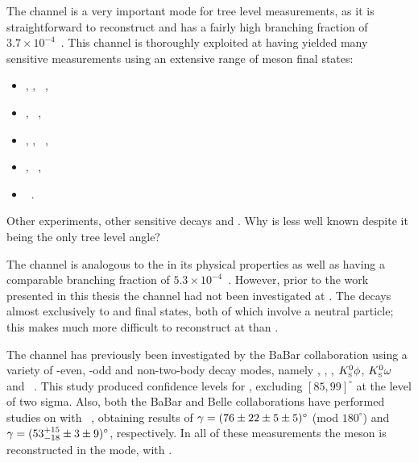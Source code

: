 The \decay{\Bm}{\D\Km} channel is a very important mode for tree level \Pgamma measurements, as it is straightforward to reconstruct and has a fairly high branching fraction of $3.7 \times 10^{-4}$~\cite{PDG2016}. This \decay{\Bm}{\D\Km} channel is thoroughly exploited at \lhcb having yielded many \Pgamma sensitive measurements using an extensive range of \D meson final states:
\begin{itemize}
\item \decay{\D}{\Kp\pim}, \Kp\Km, \pip\pim~\cite{LHCb-PAPER-2017-021},
\item \decay{\D}{\Kp\pim\pip\pim}, \pip\pim\pip\pim~\cite{LHCb-PAPER-2016-003},
\item \decay{\D}{\Kp\pim\piz}, \Kp\Km\piz, \pip\pim\piz~\cite{LHCb-PAPER-2015-014},
\item \decay{\D}{\KS\Kp\Km}, \KS\pip\pim~\cite{LHCb-PAPER-2014-041},
\item \decay{\D}{\KS\Kp\Km}~\cite{LHCb-PAPER-2013-068}.
\end{itemize}

Other experiments, other \Pgamma sensitive decays \Bz and \Bs. Why is \Pgamma less well known despite it being the only tree level angle?

The \decay{\Bm}{\D\Kstarm} channel is analogous to the \decay{\Bm}{\D\Km} in its physical properties as well as having a comparable branching fraction of $5.3 \times 10^{-4}$~\cite{PDG2016}. However, prior to the work presented in this thesis the \decay{\Bm}{\D\Kstarm} channel had not been investigated at \lhcb. The \Kstarm decays almost exclusively to \Kz\pim and \Km\piz final states, both of which involve a neutral particle; this makes \decay{\Bm}{\D\Kstarm} much more difficult to reconstruct at \lhcb than \decay{\Bm}{\D\Km}. 

The \decay{\Bm}{\D\Kstarm} channel has previously been investigated by the BaBar collaboration using a variety of \CP-even, \CP-odd and non-\CP two-body \D decay modes, namely \Km\Kp, \pim\pip, \KS\piz, ${{K}^0_{\mathrm{ \scriptscriptstyle S}}}\phi$, ${{K}^0_{\mathrm{ \scriptscriptstyle S}}}\omega$ and \Km\pip~\cite{BaBarDKstar}. This study produced confidence levels for \Pgamma, excluding $[85,99]^{\circ}$ at the level of two sigma. Also, both the BaBar and Belle collaborations have performed studies on \decay{\Bm}{\D\Kstarm} with \decay{\D}{\KS\pip\pim}~\cite{BaBarGGSZ,BelleGGSZ}, obtaining results of $\gamma = (76 \pm 22 \pm 5 \pm 5)^{\circ}$ (mod $180^{\circ}$) and $\gamma = (53^{+15}_{-18} \pm 3 \pm 9)^{\circ}$, respectively. In all of these measurements the \Kstarm meson is reconstructed in the \KS\pim mode, with \decay{\KS}{\pip\pim}.

